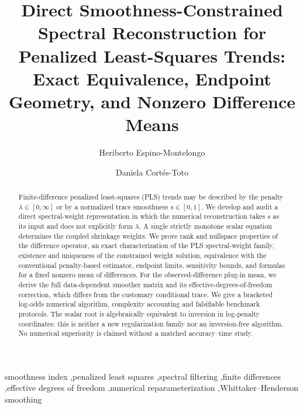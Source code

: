 \documentclass[a4paper,fleqn]{cas-dc}
\theoremstyle{definition}
\begin{document}
\let\WriteBookmarks\relax
\def\floatpagepagefraction{1}
\def\textpagefraction{.001}
\title[mode=title]{Direct Smoothness-Constrained Spectral Reconstruction for Penalized Least-Squares Trends: Exact Equivalence, Endpoint Geometry, and Nonzero Difference Means}
\author[1]{Heriberto Espino-Montelongo}
\author[1]{Daniela Cort\'es-Toto}
\begin{abstract}
Finite-difference penalized least-squares (PLS) trends may be described by the penalty $\lambda\in[0,\infty]$ or by a normalized trace smoothness $s\in[0,1]$. We develop and audit a direct spectral-weight representation in which the numerical reconstruction takes $s$ as its input and does not explicitly form $\lambda$. A single strictly monotone scalar equation determines the coupled shrinkage weights. We prove rank and nullspace properties of the difference operator, an exact characterization of the PLS spectral-weight family, existence and uniqueness of the constrained weight solution, equivalence with the conventional penalty-based estimator, endpoint limits, sensitivity bounds, and formulas for a fixed nonzero mean of differences. For the observed-difference plug-in mean, we derive the full data-dependent smoother matrix and its effective-degrees-of-freedom correction, which differs from the customary conditional trace. We give a bracketed log-odds numerical algorithm, complexity accounting and falsifiable benchmark protocols. The scalar root is algebraically equivalent to inversion in log-penalty coordinates: this is neither a new regularization family nor an inversion-free algorithm. No numerical superiority is claimed without a matched accuracy--time study.
\end{abstract}
\begin{keywords}
smoothness index \sep penalized least squares \sep spectral filtering
\sep finite differences \sep effective degrees of freedom
\sep numerical reparameterization \sep Whittaker--Henderson smoothing
\end{keywords}
\maketitle








\end{document}
